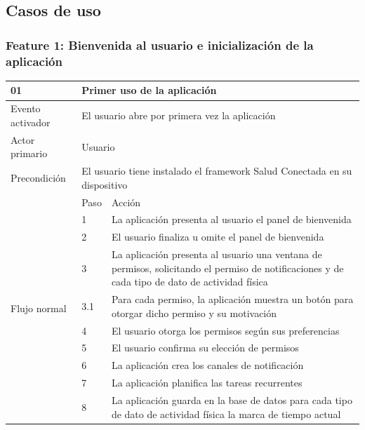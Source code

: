 \subsection{Casos de uso}

    \subsubsection{Feature 1: Bienvenida al usuario e inicialización de la aplicación}

    \begin{table}[h]
        \centering
        \begin{tabularx}{\textwidth}{|l|l|X|}
            \hline
            01 & \multicolumn{2}{|X|}{Primer uso de la aplicación} \\
            \hline
            Evento activador & \multicolumn{2}{|X|}{El usuario abre por primera vez la aplicación} \\
            \hline
            Actor primario & \multicolumn{2}{|X|}{Usuario} \\
            \hline
            Precondición & \multicolumn{2}{|X|}{El usuario tiene instalado el \gls{framework} Salud Conectada en su dispositivo} \\
            \hline
            \multirow{10}{*}{Flujo normal} & Paso & Acción \\
            \cline{2-3} & 1 & La aplicación presenta al usuario el panel de bienvenida \\
            \cline{2-3} & 2 & El usuario finaliza u omite el panel de bienvenida \\
            \cline{2-3} & 3 & La aplicación presenta al usuario una ventana de permisos, solicitando el permiso de notificaciones y de cada tipo de dato de actividad física \\
            \cline{2-3} & 3.1 & Para cada permiso, la aplicación muestra un botón para otorgar dicho permiso y su motivación \\
            \cline{2-3} & 4 & El usuario otorga los permisos según sus preferencias \\
            \cline{2-3} & 5 & El usuario confirma su elección de permisos \\
            \cline{2-3} & 6 & La aplicación crea los canales de notificación \\
            \cline{2-3} & 7 & La aplicación planifica las tareas recurrentes \\
            \cline{2-3} & 8 & La aplicación guarda en la base de datos para cada tipo de dato de actividad física la marca de tiempo actual \\

\end{tabularx}
\end{table}

